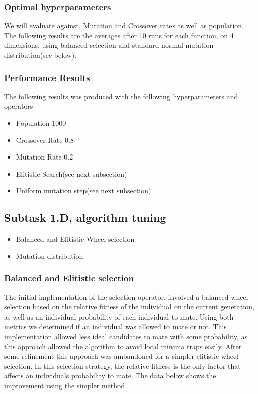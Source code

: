 \documentclass[openany]{article}
\begin{document}
			\subsubsection{Optimal hyperparameters}
				We will evaluate against, Mutation and Crossover rates as well as population. 
				The following results are the averages after 10 runs for each function, on 4 dimensions, using balanced selection and standard normal mutation distribution(see below).
			\subsubsection{Performance Results}

				\begin{note}
					The following results was produced with the following hyperparameters and operators
					\begin{itemize}
						\item Population 1000
						\item Crossover Rate 0.8
						\item Mutation Rate 0.2
						\item Elitistic Search(see next subsection)
						\item Uniform mutation step(see next subsection)
					\end{itemize}
				\end{note}
				
				
				
				
				
		\subsection{Subtask 1.D, algorithm tuning}
			\begin{itemize}
				\item Balanced and Elitistic Wheel selection
				\item Mutation distribution
			\end{itemize}
			\subsubsection{Balanced and Elitistic selection}
				The initial implementation of the selection operator, involved a balanced wheel selection based on the relative fitness of the individual on the current generation, as well as
				an individual probability of each individual to mate. Using both metrics we determined if an individual was allowed to mate or not. This implementation allowed less ideal
				candidates to mate with some probability, as this approach allowed the algorithm to avoid local minima traps easily. After some refinement this approach was ambandoned for a 
				simpler elitistic wheel selection. In this selection strategy, the relative fitness is the only factor that affects an individuals probability to mate. The data below shows the 
				improvement using the simpler method.
\end{document}
